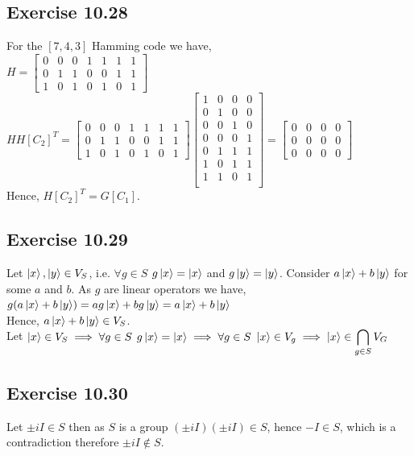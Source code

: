 \documentclass[a4paper,12pt]{article}
\begin{document}
\subsection*{Exercise 10.28}
For the $[7,4,3]$ Hamming code we have,\\
$H=
\begin{bmatrix}
    0&0&0&1&1&1&1\\
    0&1&1&0&0&1&1\\
    1&0&1&0&1&0&1
\end{bmatrix}$\\
$HH[C_2]^T=\begin{bmatrix}
    0&0&0&1&1&1&1\\
    0&1&1&0&0&1&1\\
    1&0&1&0&1&0&1
\end{bmatrix}
\begin{bmatrix}
    1&0&0&0\\
    0&1&0&0\\
    0&0&1&0\\
    0&0&0&1\\
    0&1&1&1\\
    1&0&1&1\\
    1&1&0&1\\
\end{bmatrix}=
\begin{bmatrix}
    0&0&0&0\\
    0&0&0&0\\
    0&0&0&0
\end{bmatrix}$\\
Hence, $H[C_2]^T=G[C_1]$.
\subsection*{Exercise 10.29}
Let $\ket{x},\ket{y}\in V_S$, i.e. $\forall g\in S$ 
$g\ket{x}=\ket{x}$ and $g\ket{y}=\ket{y}$. Consider $a\ket{x}+b\ket{y}$
for some $a$ and $b$. As $g$ are linear operators we have,\\
$g(a\ket{x}+b\ket{y})=ag\ket{x}+bg\ket{y}=a\ket{x}+b\ket{y}$\\
Hence, $a\ket{x}+b\ket{y}\in V_S$.\\
Let $\ket{x}\in V_S\implies \forall g\in S$ $g\ket{x}=\ket{x}\implies \forall
g\in S$ $\ket{x}\in V_g\implies \ket{x}\in \displaystyle \bigcap_{g\in S}V_G$ 
\subsection*{Exercise 10.30}
Let $\pm iI\in S$ then as $S$ is a group $(\pm iI)(\pm iI)\in S$, hence $-I\in S$, which
is a contradiction therefore $\pm iI\notin S$.
\end{document}
